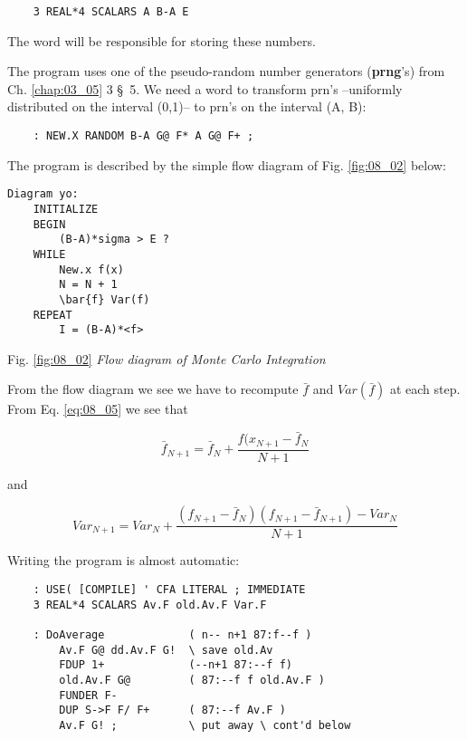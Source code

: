 \begin{lstlisting}
    3 REAL*4 SCALARS A B-A E
\end{lstlisting}

The word  will be responsible for storing these numbers.

The program uses one of the pseudo-random number generators (\textbf{prng}'s) from Ch. \ref{chap:03_05} 3 \S\ 5. We need a word to transform prn's --uniformly distributed on the interval (0,1)-- to prn's on the interval (A, B):

\begin{lstlisting}
    : NEW.X RANDOM B-A G@ F* A G@ F+ ;
\end{lstlisting}

The program is described by the simple flow diagram of Fig. \label{fig:08_02} \ref{fig:08_02} below:

\begin{lstlisting}
Diagram yo:
    INITIALIZE
    BEGIN
        (B-A)*sigma > E ?
    WHILE
        New.x f(x)
        N = N + 1
        \bar{f} Var(f)
    REPEAT
        I = (B-A)*<f>
\end{lstlisting}

Fig. \ref{fig:08_02} \textit{Flow diagram of Monte Carlo Integration}

From the flow diagram we see we have to recompute $\bar{f}$ and $Var(\bar{f})$ at each step. From Eq. \ref{eq:08_05} we see that

\begin{equation*}
\bar{f}_{N+1} = \bar{f}_N + \frac{f(x_{N+1} - \bar{f}_{N}}{N + 1}
\end{equation*}

and

\begin{equation*}
Var_{N+1} = Var_{N} + \frac{(f_{N+1}-\bar{f}_{N})(f_{N+1} - \bar{f}_{N+1})-Var_{N}}{N+1}
\end{equation*}

Writing the program is almost automatic:

\begin{lstlisting}
    : USE( [COMPILE] ' CFA LITERAL ; IMMEDIATE
    3 REAL*4 SCALARS Av.F old.Av.F Var.F

    : DoAverage             ( n-- n+1 87:f--f )
        Av.F G@ dd.Av.F G!  \ save old.Av
        FDUP 1+             (--n+1 87:--f f)
        old.Av.F G@         ( 87:--f f old.Av.F )
        FUNDER F-
        DUP S->F F/ F+      ( 87:--f Av.F )
        Av.F G! ;           \ put away \ cont'd below
\end{lstlisting}

